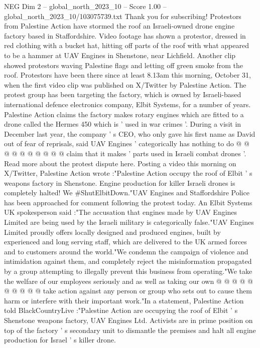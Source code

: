 \begin{textsample}{NEG Dim 2 – global\_north\_2023\_10 – Score 1.00 – global\_north\_2023\_10/103075739.txt}  \label{ex:f2_neg_160}
Thank you for subscribing!
Protestors from Palestine Action have stormed the roof an Israeli-owned drone engine factory based in Staffordshire.
Video footage has shown a protestor, dressed in red clothing with a bucket hat, hitting off parts of the roof with what appeared to be a hammer at UAV Engines in Shenstone, near Lichfield.
Another clip showed protestors waving Palestine flags and letting off green smoke from the roof.
Protestors have been there since at least 8.13am this morning, October 31, when the first video clip was published on X/Twitter by Palestine Action.
The protest group has been targeting the factory, which is owned by Israeli-based international defence electronics company, Elbit Systems, for a number of years.
Palestine Action claims the factory makes rotary engines which are fitted to a drone called the Hermes 450 which is ' used in war crimes '.
During a visit in December last year, the company ' s CEO, who only gave his first name as David out of fear of reprisals, said UAV Engines ' categorically has nothing to do @ @ @ @ @ @ @ @ @ @ claim that it makes ' parts used in Israeli combat drones '.
Read more about the protest dispute here.
Posting a video this morning on X/Twitter, Palestine Action wrote :"Palestine Action occupy the roof of Elbit ' s weapons factory in Shenstone.
Engine production for killer Israeli drones is completely halted!
We \#ShutElbitDown."UAV Engines and Staffordshire Police has been approached for comment following the protest today.
An Elbit Systems UK spokesperson said :"The accusation that engines made by UAV Engines Limited are being used by the Israeli military is categorically false."UAV Engines Limited proudly offers locally designed and produced engines, built by experienced and long serving staff, which are delivered to the UK armed forces and to customers around the world."We condemn the campaign of violence and intimidation against them, and completely reject the misinformation propagated by a group attempting to illegally prevent this business from operating."We take the welfare of our employees seriously and as well as taking our own @ @ @ @ @ @ @ @ @ @ take action against any person or group who sets out to cause them harm or interfere with their important work."In a statement, Palestine Action told BlackCountryLive :"Palestine Action are occupying the roof of Elbit ' s Shenstone weapons factory, UAV Engines Ltd.
Activists are in prime position on top of the factory ' s secondary unit to dismantle the premises and halt all engine production for Israel ' s killer drone.

\end{textsample}

